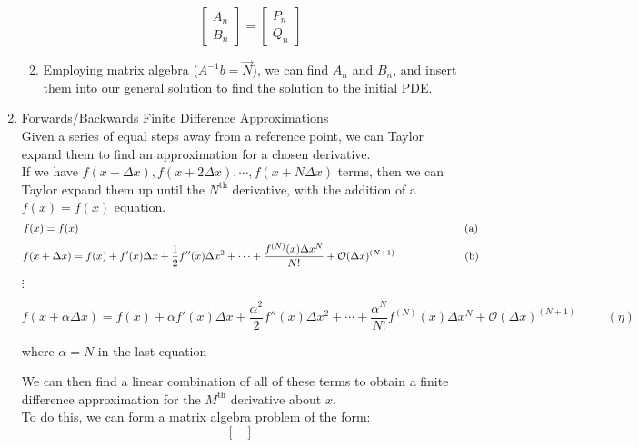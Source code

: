 \documentclass{article}
\begin{document}
\begin{enumerate}
\begin{enumerate}
\[            \begin{bmatrix}
                    A_n\\
                    B_n
            \end{bmatrix}
            =
            \begin{bmatrix}
                    P_n\\
                    Q_n
            \end{bmatrix}
        \]
        \item Employing matrix algebra ($A^{-1}b = \vec{N}$), we can find $A_n$ and $B_n$, and insert them into our general solution to find the solution to the initial PDE.
    \end{enumerate}
    
    \pagebreak
    
    \item Forwards/Backwards Finite Difference Approximations
    \medskip\\
    Given a series of equal steps away from a reference point, we can Taylor expand them to find an approximation for a chosen derivative.
    \medskip\\
    If we have $f(x + \Delta x), f(x + 2\Delta x), \cdots, f(x + N\Delta x)$ terms, then we can Taylor expand them up until the $N^\textrm{th}$ derivative, with the addition of a $f(x)=f(x)$ equation.
    \[
        f(x) = f(x) \hspace{12.75cm} \textrm{(a)}
    \]
    \[ 
        f(x + \Delta x) = f(x) + f'(x)\Delta x + \frac{1}{2}f''(x)\Delta x^2 + \cdots + \frac{f^{(N)}(x)\Delta x^N}{N!} + \mathcal{O}(\Delta x)^{(N + 1)} \hspace{2.3cm} \textrm{(b)}
    \]
    \begin{center}
        $\vdots$
    \end{center}
    \[
        f(x +\alpha\Delta x) = f(x) + \alpha f'(x)\Delta x + \frac{\alpha^2}{2}f''(x) \Delta x^2 + \cdots + \frac{\alpha^N}{N!}f^{(N)}(x)\Delta x^N + \mathcal{O}(\Delta x)^{(N + 1)} \hspace{1cm} (\eta)
    \]
    \begin{center}
        where $\alpha = N$ in the last equation
    \end{center}
    We can then find a linear combination of all of these terms to obtain a finite difference approximation for the $M^{\textrm{th}}$ derivative about $x$.
    \medskip\\
    To do this, we can form a matrix algebra problem of the form:
    \[
        \begin{bmatrix}

\end{bmatrix}\]
\end{enumerate}
\end{document}
